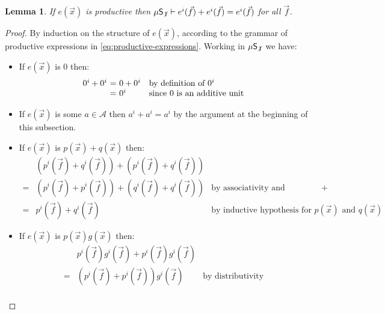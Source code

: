 \documentclass[a4paper,10pt]{amsart}
\newtheorem{lemma}[theorem]{Lemma}
\theoremstyle{definition}
\newcommand{\Alphabet}{\mathcal{A}}
\newcommand{\proves}{\vdash}
\newcommand{\id}{\mathsf{init}}
\newcommand{\basicax}{\mu\mathsf{S}}
\newcommand{\basicaxidfree}{\basicax_{\not {\hspace{.1em}1}}}
\renewcommand{\id}[1]{#1^i}
\begin{document}
\begin{lemma}
\label{idem-trans-is-idem-on-prod-exprs}
    If $e(\vec x)$ is productive then $\basicaxidfree \proves \id e(\vec f) + \id e(\vec f) = \id e(\vec f)$ for all $\vec f$.
\end{lemma}
\begin{proof}
    By induction on the structure of $e(\vec x)$, according to the grammar of productive expressions in \eqref{eq:productive-expressions}.
    Working in $\basicaxidfree$ we have:
    \begin{itemize}
        \item If $e(\vec x)$ is $0$ then: 
        \[
        \begin{array}{r@{\ = \ }ll}
             \id 0 + \id 0 & 0 + \id 0 & \text{by definition of $\id 0$} \\
                & \id 0 & \text{since $0$ is an additive unit}
        \end{array}
        \]
        \item If $e(\vec x)$ is some $a\in \Alphabet$ then $\id a + \id a = \id a$ by the argument at the beginning of this subsection.
        \item If $e(\vec x)$ is $p(\vec x) +  q(\vec x) $ then:
        \[
        \begin{array}{rll}
        & (\id p(\vec f) + \id q(\vec f)) + (\id p(\vec f) + \id q(\vec f)) & 
        \\
          =& (\id p(\vec f) + \id p(\vec f)) + (\id q(\vec f) + \id q(\vec f)) & \text{by associativity and commutativity of $+$} \\
            =& \id p(\vec f) + \id q(\vec f) & \text{by inductive hypothesis for $p(\vec x)$ and $q(\vec x)$} 
        \end{array}
        \]
        \item If $e(\vec x)$ is $p(\vec x)g(\vec x)$ then:
        \[
        \begin{array}{rll}
        &  \id p(\vec f)\id g(\vec f) + \id p(\vec f) \id g(\vec f) & 
        \\
          =  & (\id p(\vec f) + \id p(\vec f))\id g(\vec f) & \text{by distributivity} \\

\end{array}\]
\end{itemize}
\end{proof}
\end{document}
